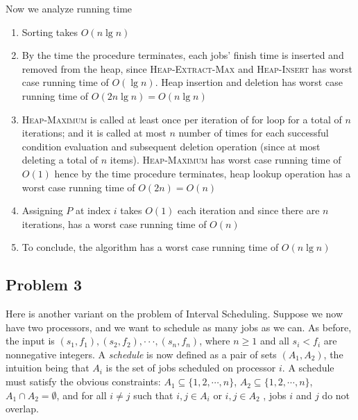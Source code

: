 \documentclass[11pt]{article}
\begin{document}
\begin{enumerate}
     Now we analyze running time
     \begin{enumerate}
       \item Sorting takes $O(n\lg n)$
       \item By the time the procedure terminates, each jobs' finish time is inserted and removed from the heap, since  \textsc{Heap-Extract-Max} and \textsc{Heap-Insert} has worst case running time of $O(\lg n)$. Heap insertion and deletion has worst case running time of $O(2n\lg n) = O(n\lg n)$
       \item \textsc{Heap-Maximum} is called at least once per iteration of for loop for a total of $n$ iterations; and it is called at most $n$ number of times for each successful condition evaluation and subsequent deletion operation (since at most deleting a total of $n$ items). \textsc{Heap-Maximum} has worst case running time of $O(1)$ hence by the time procedure terminates, heap lookup operation has a worst case running time of $O(2n) = O(n)$
       \item Assigning $P$ at index $i$ takes $O(1)$ each iteration and since there are $n$ iterations, has a worst case running time of $O(n)$
       \item To conclude, the algorithm has a worst case running time of $O(n\lg n)$
     \end{enumerate}

\end{enumerate}


\subsection*{Problem 3}

Here is another variant on the problem of Interval Scheduling. Suppose we now have two processors, and we want to schedule as many jobs as we can. As before, the input is $(s_1,f_1), (s_2,f_2), ···, (s_n,f_n)$, where $n \geq 1$ and all $s_i < f_i$ are nonnegative integers. A \textit{schedule} is now defined as a pair of sets $(A_1,A_2)$, the intuition being that $A_i$ is the set of jobs scheduled on processor $i$. A schedule must satisfy the obvious constraints: $A_1 \subseteq \{1,2,\cdots,n\}$, $A_2\subseteq \{1, 2,\cdots , n\}$, $A_1 \cap A_2 = \emptyset$, and for all $i\neq j$ such that $i , j \in A_i$ or $i , j \in A_2$ , jobs $i$ and $j$ do not overlap.
\end{document}

